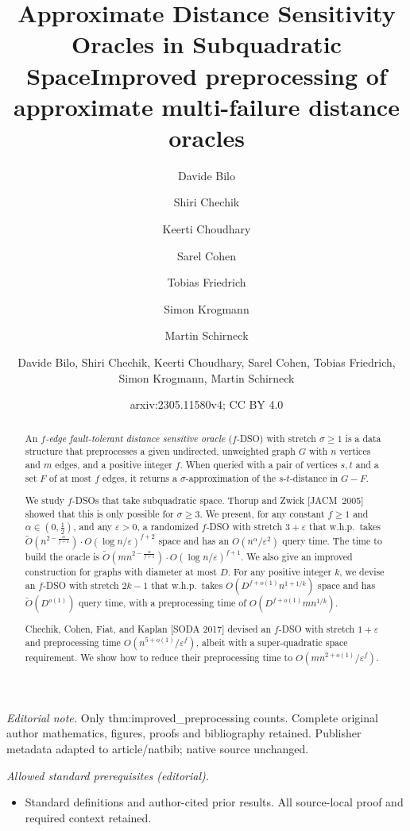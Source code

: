 \documentclass{article}\usepackage[a4paper,margin=20mm]{geometry}
\title{Approximate Distance Sensitivity Oracles in Subquadratic Space}
\author{Davide Bilo \and Shiri Chechik \and Keerti Choudhary \and Sarel Cohen \and Tobias Friedrich \and Simon Krogmann \and Martin Schirneck}\date{}
\title{Improved preprocessing of approximate multi-failure distance oracles}
\author{Davide Bilo, Shiri Chechik, Keerti Choudhary, Sarel Cohen, Tobias Friedrich, Simon Krogmann, Martin Schirneck}
\date{arxiv:2305.11580v4; CC BY 4.0}
\renewcommand{\ge}{\geqslant}
\begin{document}
\maketitle
\noindent\textit{Editorial note.} Only thm:improved\_preprocessing counts. Complete original author mathematics, figures, proofs and bibliography retained. Publisher metadata adapted to article/natbib; native source unchanged.\par\medskip
\noindent\textit{Allowed standard prerequisites (editorial).}\begin{itemize}
\item Standard definitions and author-cited prior results. All source-local proof and required context retained.
\end{itemize}\medskip
\maketitle

\begin{abstract}
	An \emph{\(f\)-edge fault-tolerant distance sensitive oracle} (\(f\)-DSO) with stretch \(\sigma \ge 1\)
	is a data structure that preprocesses a given undirected, unweighted graph \(G\) with \(n\) vertices and \(m\) edges, 
	and a positive integer \(f\).
	When queried with a pair of vertices \(s, t\) and a set \(F\) of at most \(f\) edges,
	it returns a \(\sigma\)-approximation of the \(s\)-\(t\)-distance in \(G-F\).

	We study \(f\)-DSOs that take subquadratic space.
	Thorup and Zwick [JACM~2005] showed that this is only possible for \(\sigma \ge 3\).
	We present, for any constant \(f \ge 1\) and \(\alpha \in (0, \frac{1}{2})\), 
	and any \(\varepsilon  > 0\), 
	a randomized \mbox{\(f\)-DSO} with stretch \( 3 + \varepsilon\)
	that w.h.p.\ takes 
	\(\widetilde{O}(n^{2-\frac{\alpha}{f+1}}) \cdot O(\log n/\varepsilon)^{f+2}\)
	space and has an \(O(n^\alpha/\varepsilon^2)\) query time.
	The time to build the oracle is \(\widetilde{O}(mn^{2-\frac{\alpha}{f+1}}) \cdot O(\log n/\varepsilon)^{f+1}\).
	We also give an improved construction for graphs with diameter at most \(D\).
	For any positive integer \(k\), we devise an \(f\)-DSO with stretch \(2k-1\) that w.h.p.\ takes
	\(O(D^{f+o(1)} n^{1+1/k})\) space and has \(\widetilde{O}(D^{o(1)})\) query time,
	with a preprocessing time of \(O(D^{f+o(1)} mn^{1/k})\).
  
	Chechik, Cohen, Fiat, and Kaplan [SODA 2017] devised an \(f\)-DSO with stretch \(1{+}\varepsilon\) 
	and preprocessing time $O(n^{5+o(1)}/\varepsilon^f)$, 
	albeit with a super-quadratic space requirement.
	We show how to reduce their preprocessing time to $O(mn^{2+o(1)}/\varepsilon^f)$.
\end{abstract}
\end{document}
